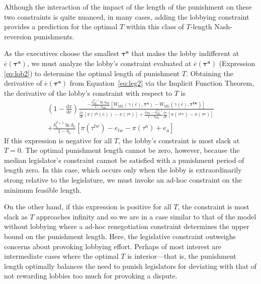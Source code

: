 \documentclass[authoryear, review]{elsarticle}
\newcommand{\ov}{\overline}
\newcommand{\bta}{\bm{\tau^a}}
\newcommand{\ga}{\gamma}
\newcommand{\btw}{\bm{\tau^{tw}}}
\newcommand{\de}{\delta}
\begin{document}
Although the interaction of the impact of the length of the punishment on these two constraints is quite nuanced, in many cases, adding the lobbying constraint provides a prediction for the optimal $T$ within this class of $T$-length Nash-reversion punishments.

As the executives choose the smallest $\bta$ that makes the lobby indifferent at $\ov{e}(\bta)$, we must analyze the lobby's constraint evaluated at $\ov{e}(\bta)$ (Expression \ref{eq:lob2}) to determine the optimal length of punishment $T$. Obtaining the derivative of $\ov{e}(\bta)$ from Equation~\ref{eq:leg2} via the Implicit Function Theorem, the derivative of the lobby's constraint with respect to $T$ is
\begin{multline}
 	\left(1 - \frac{\mathrm{d} \pi}{\mathrm{d} \ov{e}} \right) \frac{ -\frac{\de_\text{ML}^{T+1}\ln\de_\text{ML}}{1-\de_\text{ML}}\left[  W_\text{ML}(\ga(\ov{e}),\bta) - W_\text{ML}(\ga(\ov{e}),\btw) \right]}{\frac{\partial \ga}{\partial e} \left[ \pi(\tau^b(\ov{e})) - \pi(\tau^a) \right] + \frac{\de_\text{ML} - \de_\text{ML}^{T+1}}{1-\de_\text{ML}}\frac{\partial \ga}{\partial e} \left[ \pi(\tau^{tw}) - \pi(\tau^a) \right]} \\
	+  \frac{\de_\text{L}^{T+1} \ln \de_\text{L}}{1-\de_\text{L}} \left[ \pi(\tau^{tw}) - e_{tw} -\pi(\tau^a) + e_a \right]
 	\label{ine:T}
\end{multline}
If this expression is negative for all $T$, the lobby's constraint is most slack at $T=0$. The optimal punishment length cannot be zero, however, because the median legislator's constraint cannot be satisfied with a punishment period of length zero. In this case, which occurs only when the lobby is extraordinarily strong relative to the legislature, we must invoke an ad-hoc constraint on the minimum feasible length.

On the other hand, if this expression is positive for all $T$, the constraint is most slack as $T$ approaches infinity and so we are in a case similar to that of the model without lobbying where a ad-hoc renegotiation constraint determines the upper bound on the punishment length. Here, the legislative constraint outweighs concerns about provoking lobbying effort. Perhaps of most interest are intermediate cases where the optimal $T$ is interior---that is, the punishment length optimally balances the need to punish legislators for deviating with that of not rewarding lobbies too much for provoking a dispute.
\end{document}

